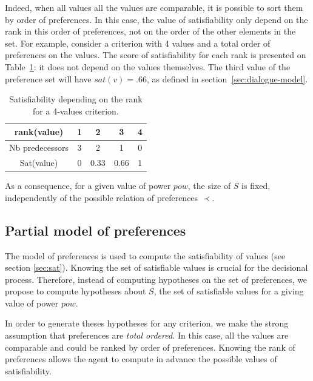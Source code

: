 \documentclass[sigconf]{aamas}  %
\begin{document}
	Indeed, when all values all the values are comparable, it is possible to sort them by order of preferences. In this case, the value of satisfiability only depend on the rank in this order of preferences, not on the order of the other elements in the set. For example, consider a criterion with 4 values and a total order of preferences on the values. The score of satisfiability for each rank is presented on Table~\ref{tab:poss}: it does not depend on the values themselves. The third value of the preference set will have $sat(v)=.66$, as defined in section~\ref{sec:dialogue-model}.
		\begin{table}[h]
			\caption{Satisfiability depending on the rank for a 4-values criterion.}
			\label{tab:poss}
			\centering
			\begin{tabular}{ |c|c|c|c|c| }
				\hline				
				rank(value) & 1 & 2 & 3 & 4 \\
				\hline
				Nb predecessors & 3 & 2 & 1& 0 \\
				\hline
				Sat(value) & 0 & 0.33 & 0.66 &1 \\
				\hline
			\end{tabular}
		\end{table}
	
	As a consequence, for a given value of power $pow$, the size of $S$ is fixed, independently of the possible relation of preferences $\prec$.
	
	
	\subsection{Partial model of preferences}
	
	The model of preferences is used to compute the satisfiability of values (see section \ref{sec:sat}). Knowing the set of satisfiable values is crucial for the decisional process. Therefore, instead of computing hypotheses on the set of preferences, we propose to compute hypotheses about $S$, the set of satisfiable values for a giving value of power $pow$.  
	
	\par In order to generate theses hypotheses for any criterion, we make the strong assumption that preferences are \emph{total ordered.} In this case, all the values are comparable and could be ranked by order of preferences. Knowing the rank of preferences allows the agent to compute in advance the possible values of satisfiability.
	
\end{document}
